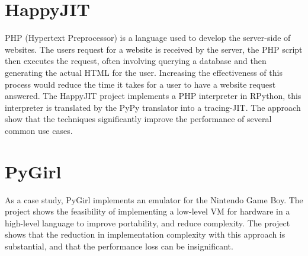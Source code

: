 \section{HappyJIT}

PHP (Hypertext Preprocessor) is a language used to develop the server-side of 
websites. The users request for a website is received by the server, the PHP script
then executes the request, often involving querying a database and then generating 
the actual HTML for the user. Increasing the effectiveness of this process would
reduce the time it takes for a user to have a website request answered. 
The HappyJIT project implements a PHP interpreter in RPython, this interpreter is 
translated by the PyPy translator into a tracing-JIT. The approach show that 
the techniques significantly improve the performance of several common use cases.
\cite{homescu2011happyjit}

\section{PyGirl}

As a case study, PyGirl implements an emulator for the Nintendo Game Boy. The project 
shows the feasibility of implementing a low-level VM for hardware in a high-level 
language to improve portability, and reduce complexity. The project shows that the
reduction in implementation complexity with this approach is substantial, 
and that the performance loss can be insignificant.
\cite{bruni2009pygirl}


